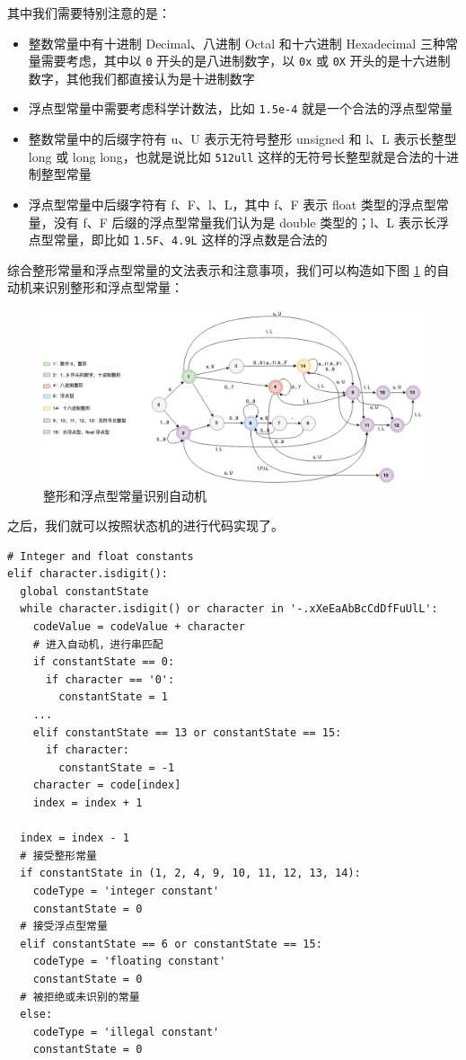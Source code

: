 \documentclass[UTF8]{ctexart}
\begin{document}
其中我们需要特别注意的是：
\begin{itemize}
  \item 整数常量中有十进制 Decimal、八进制 Octal 和十六进制 Hexadecimal 三种常量需要考虑，其中以 \texttt{0} 开头的是八进制数字，以 \texttt{0x} 或 \texttt{0X} 开头的是十六进制数字，其他我们都直接认为是十进制数字
  \item 浮点型常量中需要考虑科学计数法，比如 \texttt{1.5e-4} 就是一个合法的浮点型常量
  \item 整数常量中的后缀字符有 u、U 表示无符号整形 unsigned 和 l、L 表示长整型 long 或 long long，也就是说比如 \texttt{512ull} 这样的无符号长整型就是合法的十进制整型常量
  \item 浮点型常量中后缀字符有 f、F、l、L，其中 f、F 表示 float 类型的浮点型常量，没有 f、F 后缀的浮点型常量我们认为是 double 类型的；l、L 表示长浮点型常量，即比如 \texttt{1.5F}、\texttt{4.9L} 这样的浮点数是合法的
\end{itemize}

综合整形常量和浮点型常量的文法表示和注意事项，我们可以构造如下图 \ref{fig:figure3} 的自动机来识别整形和浮点型常量：

\begin{figure}[h]
  \centering
  \includegraphics[width=\linewidth]{images/constant.png}
  \caption{整形和浮点型常量识别自动机}
  \label{fig:figure3}
\end{figure}

之后，我们就可以按照状态机的进行代码实现了。

\begin{verbatim}
# Integer and float constants
elif character.isdigit():
  global constantState
  while character.isdigit() or character in '-.xXeEaAbBcCdDfFuUlL':
    codeValue = codeValue + character
    # 进入自动机，进行串匹配
    if constantState == 0:
      if character == '0':
        constantState = 1
    ...
    elif constantState == 13 or constantState == 15:
      if character:
        constantState = -1
    character = code[index]
    index = index + 1

  index = index - 1
  # 接受整形常量
  if constantState in (1, 2, 4, 9, 10, 11, 12, 13, 14):
    codeType = 'integer constant'
    constantState = 0
  # 接受浮点型常量
  elif constantState == 6 or constantState == 15:
    codeType = 'floating constant'
    constantState = 0
  # 被拒绝或未识别的常量
  else:
    codeType = 'illegal constant'
    constantState = 0
\end{verbatim}
\end{document}
